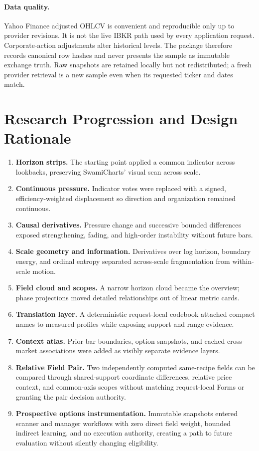 \documentclass{article}
\begin{document}
\paragraph{Data quality.}
Yahoo Finance adjusted OHLCV is convenient and reproducible only up to provider revisions. It is not the live IBKR path used by every application request. Corporate-action adjustments alter historical levels. The package therefore records canonical row hashes and never presents the sample as immutable exchange truth. Raw snapshots are retained locally but not redistributed; a fresh provider retrieval is a new sample even when its requested ticker and dates match.

\section{Research Progression and Design Rationale}

\begin{enumerate}
    \item \textbf{Horizon strips.} The starting point applied a common indicator across lookbacks, preserving SwamiCharts' visual scan across scale.
    \item \textbf{Continuous pressure.} Indicator votes were replaced with a signed, efficiency-weighted displacement so direction and organization remained continuous.
    \item \textbf{Causal derivatives.} Pressure change and successive bounded differences exposed strengthening, fading, and high-order instability without future bars.
    \item \textbf{Scale geometry and information.} Derivatives over log horizon, boundary energy, and ordinal entropy separated across-scale fragmentation from within-scale motion.
    \item \textbf{Field cloud and scopes.} A narrow horizon cloud became the overview; phase projections moved detailed relationships out of linear metric cards.
    \item \textbf{Translation layer.} A deterministic request-local codebook attached compact names to measured profiles while exposing support and range evidence.
    \item \textbf{Context atlas.} Prior-bar boundaries, option snapshots, and cached cross-market associations were added as visibly separate evidence layers.
    \item \textbf{Relative Field Pair.} Two independently computed same-recipe fields can be compared through shared-support coordinate differences, relative price context, and common-axis scopes without matching request-local Forms or granting the pair decision authority.
    \item \textbf{Prospective options instrumentation.} Immutable snapshots entered scanner and manager workflows with zero direct field weight, bounded indirect learning, and no execution authority, creating a path to future evaluation without silently changing eligibility.
\end{enumerate}
\end{document}
